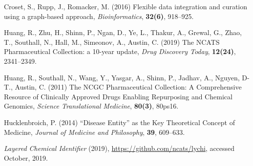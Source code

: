 \documentclass{bioinfo}
\begin{document}
\begin{thebibliography}{}
Croset, S., Rupp, J., Romacker, M. (2016) Flexible data integration and curation using a graph-based approach, \emph{Bioinformatics}, \textbf{32(6)}, 918--925.

Huang, R., Zhu, H., Shinn, P., Ngan, D., Ye, L., Thakur, A.,
Grewal, G., Zhao, T., Southall, N., Hall, M., Simeonov, A., Austin, C. (2019) The NCATS Pharmaceutical Collection: a 10-year update, \emph{Drug Discovery Today}, \textbf{12(24)}, 2341--2349.

Huang, R., Southall, N., Wang, Y., Yasgar, A., Shinn, P.,
Jadhav, A., Nguyen, D-T., Austin, C. (2011) The NCGC Pharmaceutical Collection:
A Comprehensive Resource of Clinically Approved Drugs Enabling Repurposing and Chemical Genomics, \emph{Science Translational Medicine}, \textbf{80(3)}, 80ps16.

Hucklenbroich, P. (2014) ``Disease Entity'' as the Key Theoretical Concept of Medicine, \emph{Journal of Medicine and Philosophy}, \textbf{39}, 609--633.

\emph{Layered Chemical Identifier} (2019), \url{https://github.com/ncats/lychi}, accessed October, 2019.








\end{thebibliography}
\end{document}
